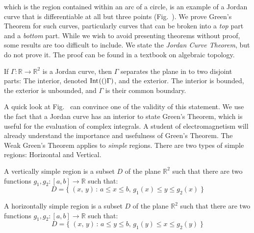     which is the region contained within an arc of a circle, is an example
    of a Jordan curve that is differentiable at all but three points
    (Fig.~). We prove Green's
    Theorem for such curves, particularly curves that can be broken into a
    \textit{top} part and a \textit{bottom} part. While we wish to avoid
    presenting theorems without proof, some results are too difficult to
    include. We state the \textit{Jordan Curve Theorem}, but do not prove
    it. The proof can be found in a textbook on algebraic topology.
    \begin{theorem}
        If $\Gamma:\mathbb{R}\rightarrow\mathbb{R}^{2}$ is a Jordan curve,
        then $\Gamma$ separates the plane in to two disjoint parts: The
        interior, denoted $\interior[](\Gamma)$, and the exterior. The interior
        is bounded, the exterior is unbounded, and
        $\Gamma$ is their common boundary.
    \end{theorem}
    A quick look at Fig.~ can
    convince one of the validity of this statement. We use the fact that a
    Jordan curve has an interior to state Green's Theorem, which is useful
    for the evaluation of complex integrals. A student of electromagnetism
    will already understand the importance and usefulness of Green's
    Theorem. The Weak Green's Theorem applies to \textit{simple} regions.
    There are two types of simple regions: Horizontal and Vertical.
    \begin{definition}
        A vertically simple region is a subset $D$ of
        the plane $\mathbb{R}^{2}$ such that there are
        two functions
        $g_{1},g_{2}:[a,b]\rightarrow\mathbb{R}$ such that:
        \begin{equation}
            D=\{\;(x,\,y)\,:\,a\leq{x}\leq{b},\,
                              g_{1}(x)\leq{y}\leq{g}_{2}(x)\;\}
        \end{equation}
    \end{definition}
    \begin{definition}
        A horizontally simple region is a subset $D$
        of the plane
        $\mathbb{R}^{2}$ such that there are two functions
        $g_{1},g_{2}:[a,b]\rightarrow\mathbb{R}$ such that:
        \begin{equation}
            D=\{\;(x,\,y)\,:\,a\leq{y}\leq{b},\,
                              g_{1}(y)\leq{x}\leq{g}_{2}(y)\;\}
        \end{equation}
    \end{definition}
